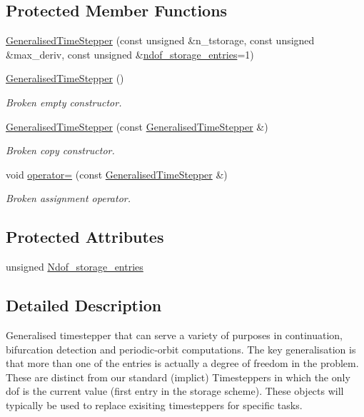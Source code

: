 \subsection*{Protected Member Functions}
\begin{DoxyCompactItemize}
\item 
\hyperlink{classoomph_1_1GeneralisedTimeStepper_a900fa5bbfd48ee5a133ed8c6c2ba44a8}{Generalised\+Time\+Stepper} (const unsigned \&n\+\_\+tstorage, const unsigned \&max\+\_\+deriv, const unsigned \&\hyperlink{classoomph_1_1GeneralisedTimeStepper_a0ffd908ef40b0dcd0ef5a4adbfbe4d3e}{ndof\+\_\+storage\+\_\+entries}=1)
\item 
\hyperlink{classoomph_1_1GeneralisedTimeStepper_a8a200841329ed3abbf45ebe051598967}{Generalised\+Time\+Stepper} ()
\begin{DoxyCompactList}\small\item\em Broken empty constructor. \end{DoxyCompactList}\item 
\hyperlink{classoomph_1_1GeneralisedTimeStepper_aa7fc21faecb4859ec7cbaf212a88d082}{Generalised\+Time\+Stepper} (const \hyperlink{classoomph_1_1GeneralisedTimeStepper}{Generalised\+Time\+Stepper} \&)
\begin{DoxyCompactList}\small\item\em Broken copy constructor. \end{DoxyCompactList}\item 
void \hyperlink{classoomph_1_1GeneralisedTimeStepper_af89420c5b7f70db01b9f568687c1dc83}{operator=} (const \hyperlink{classoomph_1_1GeneralisedTimeStepper}{Generalised\+Time\+Stepper} \&)
\begin{DoxyCompactList}\small\item\em Broken assignment operator. \end{DoxyCompactList}\end{DoxyCompactItemize}
\subsection*{Protected Attributes}
\begin{DoxyCompactItemize}
\item 
unsigned \hyperlink{classoomph_1_1GeneralisedTimeStepper_a5041d173762ea30fbd724281df50f1fc}{Ndof\+\_\+storage\+\_\+entries}
\end{DoxyCompactItemize}


\subsection{Detailed Description}
Generalised timestepper that can serve a variety of purposes in continuation, bifurcation detection and periodic-\/orbit computations. The key generalisation is that more than one of the entries is actually a degree of freedom in the problem. These are distinct from our standard (implict) Timesteppers in which the only dof is the current value (first entry in the storage scheme). These objects will typically be used to replace exisiting timesteppers for specific tasks. 

